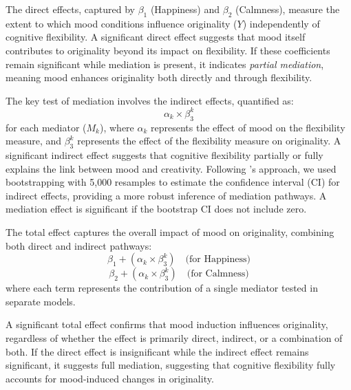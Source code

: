 \documentclass[../MA_Thesis.tex]{subfiles}
\begin{document}
The direct effects, captured by \( \beta_1 \) (Happiness) and \( \beta_2 \) (Calmness), measure the extent to which mood conditions influence originality (\(Y\)) independently of cognitive flexibility. A significant direct effect suggests that mood itself contributes to originality beyond its impact on flexibility. If these coefficients remain significant while mediation is present, it indicates \textit{partial mediation}, meaning mood enhances originality both directly and through flexibility.

The key test of mediation involves the indirect effects, quantified as:
\begin{equation*}
    \alpha_k \times \beta_3^k
\end{equation*}
for each mediator (\(M_k\)), where \( \alpha_k \) represents the effect of mood on the flexibility measure, and \( \beta_3^k \) represents the effect of the flexibility measure on originality. A significant indirect effect suggests that cognitive flexibility partially or fully explains the link between mood and creativity. Following \textcite{preacher_asymptotic_2008}'s approach, we used bootstrapping with 5,000 resamples to estimate the confidence interval (CI) for indirect effects, providing a more robust inference of mediation pathways. A mediation effect is significant if the bootstrap CI does not include zero.

The total effect captures the overall impact of mood on originality, combining both direct and indirect pathways:
\begin{equation*}
    \beta_1 + (\alpha_k \times \beta_3^k) \quad \text{(for Happiness)}
\end{equation*}
\begin{equation*}
    \beta_2 + (\alpha_k \times \beta_3^k) \quad \text{(for Calmness)}
\end{equation*}
where each term represents the contribution of a single mediator tested in separate models.

A significant total effect confirms that mood induction influences originality, regardless of whether the effect is primarily direct, indirect, or a combination of both. If the direct effect is insignificant while the indirect effect remains significant, it suggests full mediation, suggesting that cognitive flexibility fully accounts for mood-induced changes in originality.
\end{document}
